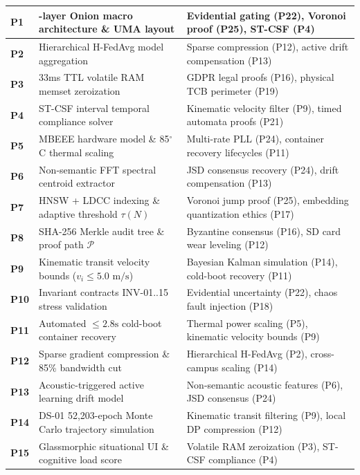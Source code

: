 \documentclass[11pt,letterpaper]{article}
\begin{document}
\begin{longtable}{>{\centering\sloppy\arraybackslash}p{1.2cm}>{\raggedright\sloppy\arraybackslash}p{5.8cm}>{\raggedright\sloppy\arraybackslash}p{8.0cm}}
\bottomrule
\endlastfoot
\textbf{P1} & 8-layer Onion macro architecture \& UMA layout & Evidential gating (P22), Voronoi proof (P25), ST-CSF (P4) \\ \midrule
\textbf{P2} & Hierarchical H-FedAvg model aggregation & Sparse compression (P12), active drift compensation (P13) \\ \midrule
\textbf{P3} & 33ms TTL volatile RAM memset zeroization & GDPR legal proofs (P16), physical TCB perimeter (P19) \\ \midrule
\textbf{P4} & ST-CSF interval temporal compliance solver & Kinematic velocity filter (P9), timed automata proofs (P21) \\ \midrule
\textbf{P5} & MBEEE hardware model \& 85$^\circ$C thermal scaling & Multi-rate PLL (P24), container recovery lifecycles (P11) \\ \midrule
\textbf{P6} & Non-semantic FFT spectral centroid extractor & JSD consensus recovery (P24), drift compensation (P13) \\ \midrule
\textbf{P7} & HNSW + LDCC indexing \& adaptive threshold $\tau(N)$ & Voronoi jump proof (P25), embedding quantization ethics (P17) \\ \midrule
\textbf{P8} & SHA-256 Merkle audit tree \& proof path $\mathcal{P}$ & Byzantine consensus (P16), SD card wear leveling (P12) \\ \midrule
\textbf{P9} & Kinematic transit velocity bounds ($v_i \le 5.0\text{ m/s}$) & Bayesian Kalman simulation (P14), cold-boot recovery (P11) \\ \midrule
\textbf{P10} & Invariant contracts INV-01..15 stress validation & Evidential uncertainty (P22), chaos fault injection (P18) \\ \midrule
\textbf{P11} & Automated $\le 2.8\text{s}$ cold-boot container recovery & Thermal power scaling (P5), kinematic velocity bounds (P9) \\ \midrule
\textbf{P12} & Sparse gradient compression \& 85\% bandwidth cut & Hierarchical H-FedAvg (P2), cross-campus scaling (P14) \\ \midrule
\textbf{P13} & Acoustic-triggered active learning drift model & Non-semantic acoustic features (P6), JSD consensus (P24) \\ \midrule
\textbf{P14} & DS-01 52,203-epoch Monte Carlo trajectory simulation & Kinematic transit filtering (P9), local DP compression (P12) \\ \midrule
\textbf{P15} & Glassmorphic situational UI \& cognitive load score & Volatile RAM zeroization (P3), ST-CSF compliance (P4) \\ \midrule

\end{longtable}
\end{document}
